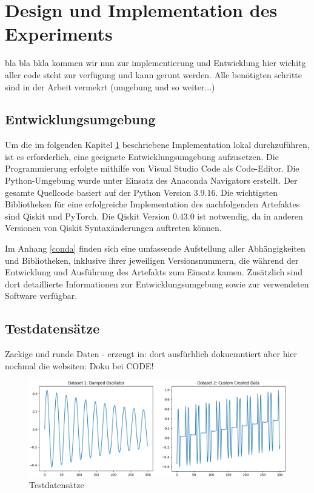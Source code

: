 \chapter{Design und Implementation des Experiments}\label{design}

bla bla bkla kommen wir nun zur implementierung und Entwicklung
hier wichitg aller code steht zur verfügung und kann gerunt werden. Alle benötigten schritte sind in der Arbeit vermekrt (umgebung und so weiter...)


\section{Entwicklungsumgebung}

Um die im folgenden Kapitel \ref{design} beschriebene Implementation lokal durchzuführen, ist es erforderlich, eine geeignete Entwicklungsumgebung aufzusetzen.
Die Programmierung erfolgte mithilfe von Visual Studio Code als Code-Editor. Die Python-Umgebung wurde unter Einsatz des Anaconda Navigators erstellt.
Der gesamte Quellcode basiert auf der Python Version 3.9.16.
Die wichtigsten Bibliotheken für eine erfolgreiche Implementation des nachfolgenden Artefaktes sind Qiskit und PyTorch.
Die Qiskit Version 0.43.0 ist notwendig, da in anderen Versionen von Qiskit Syntaxänderungen auftreten können.

Im Anhang \ref{conda} finden sich eine umfassende Aufstellung aller Abhängigkeiten und Bibliotheken, inklusive ihrer jeweiligen Versionsnummern, die während der Entwicklung und Ausführung des Artefakts zum Einsatz kamen. Zusätzlich sind dort detaillierte Informationen zur Entwicklungsumgebung sowie zur verwendeten Software verfügbar.




\section{Testdatensätze}

Zackige und runde Daten - erzeugt in: dort ausfürhlich dokuemntiert 
aber hier nochmal die websiten: 
Doku bei CODE!

\begin{figure}[htb]
    \includegraphics[width=16cm]{lib/graphics/data.png}
    \caption[Testdatensätze]{Testdatensätze}
    \label{abb:datasets}
\end{figure}



